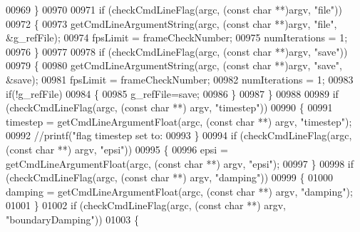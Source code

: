 \begin{DoxyCode}
{{{{{{{{00969         \}
00970 
00971         \textcolor{keywordflow}{if} (checkCmdLineFlag(argc, (\textcolor{keyword}{const} \textcolor{keywordtype}{char} **)argv, \textcolor{stringliteral}{"file"}))
00972         \{
00973             getCmdLineArgumentString(argc, (\textcolor{keyword}{const} \textcolor{keywordtype}{char} **)argv, \textcolor{stringliteral}{"file"}, &g\_refFile);
00974             fpsLimit = frameCheckNumber;
00975             numIterations = 1;
00976         \}
00977 
00978                 \textcolor{keywordflow}{if} (checkCmdLineFlag(argc, (\textcolor{keyword}{const} \textcolor{keywordtype}{char} **)argv, \textcolor{stringliteral}{"save"}))
00979         \{
00980             getCmdLineArgumentString(argc, (\textcolor{keyword}{const} \textcolor{keywordtype}{char} **)argv, \textcolor{stringliteral}{"save"}, &save);
00981                         fpsLimit = frameCheckNumber;
00982             numIterations = 1;
00983                         \textcolor{keywordflow}{if}(!g\_refFile)
00984                         \{
00985                                 g\_refFile=save;
00986                         \}
00987         \}
00988 
00989                 \textcolor{keywordflow}{if} (checkCmdLineFlag(argc, (\textcolor{keyword}{const} \textcolor{keywordtype}{char} **) argv, \textcolor{stringliteral}{"timestep"}))
00990         \{
00991             timestep = getCmdLineArgumentFloat(argc, (\textcolor{keyword}{const} \textcolor{keywordtype}{char} **) argv, \textcolor{stringliteral}{"timestep"});
00992                         \textcolor{comment}{//printf("flag timestep set to: %
00993         \}
00994                 \textcolor{keywordflow}{if} (checkCmdLineFlag(argc, (\textcolor{keyword}{const} \textcolor{keywordtype}{char} **) argv, \textcolor{stringliteral}{"epsi"}))
00995         \{
00996             epsi = getCmdLineArgumentFloat(argc, (\textcolor{keyword}{const} \textcolor{keywordtype}{char} **) argv, \textcolor{stringliteral}{"epsi"});
00997         \}
00998                 \textcolor{keywordflow}{if} (checkCmdLineFlag(argc, (\textcolor{keyword}{const} \textcolor{keywordtype}{char} **) argv, \textcolor{stringliteral}{"damping"}))
00999         \{
01000             damping = getCmdLineArgumentFloat(argc, (\textcolor{keyword}{const} \textcolor{keywordtype}{char} **) argv, \textcolor{stringliteral}{"damping"});
01001         \}
01002                 \textcolor{keywordflow}{if} (checkCmdLineFlag(argc, (\textcolor{keyword}{const} \textcolor{keywordtype}{char} **) argv, \textcolor{stringliteral}{"boundaryDamping"}))
01003         \{
}}}}}}}}}
\end{DoxyCode}
